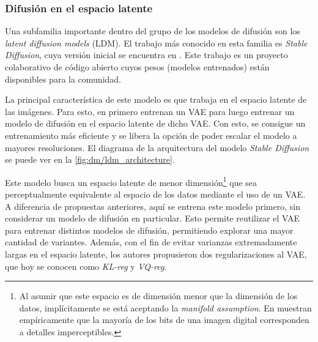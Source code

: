 \subsubsection{Difusión en el espacio latente}

Una subfamilia importante dentro del grupo de los modelos de difusión son los \textit{latent diffusion models} (LDM). El trabajo más conocido en esta familia es \textit{Stable Diffusion}, cuya versión inicial se encuentra en \cite{rombach2022highresolution}. Este trabajo es un proyecto colaborativo de código abierto cuyos pesos (modelos entrenados) están disponibles para la comunidad.

La principal característica de este modelo es que trabaja en el espacio latente de las imágenes. Para esto, en \cite{rombach2022highresolution} primero entrenan un VAE para luego entrenar un modelo de difusión en el espacio latente de dicho VAE. Con esto, se consigue un entrenamiento más eficiente y se libera la opción de poder escalar el modelo a mayores resoluciones. El diagrama de la arquitectura del modelo \textit{Stable Diffusion} se puede ver en la \autoref{fig:dm/ldm_architecture}.


Este modelo busca un espacio latente de menor dimensión\footnote{Al asumir que este espacio es de dimensión menor que la dimensión de los datos, implícitamente se está aceptando la \textit{manifold assumption}. En \cite{rombach2022highresolution} muestran empíricamente que la mayoría de los bits de una imagen digital corresponden a detalles imperceptibles.} que sea perceptualmente equivalente al espacio de los datos mediante el uso de un VAE. A diferencia de propuestas anteriores, aquí se entrena este modelo primero, sin considerar un modelo de difusión en particular. Esto permite reutilizar el VAE para entrenar distintos modelos de difusión, permitiendo explorar una mayor cantidad de variantes. Además, con el fin de evitar varianzas extremadamente largas en el espacio latente, los autores propusieron dos regularizaciones al VAE, que hoy se conocen como \textit{KL-reg} y \textit{VQ-reg}.


